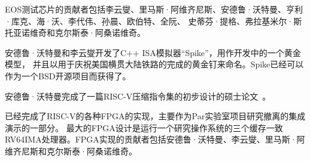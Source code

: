 EOS测试芯片的贡献者包括李云燮、里马斯·阿维齐尼斯、安德鲁·沃特曼、亨利·库克、海·沃、李代伟、孙晨、欧伯特、全阮、
史蒂芬·提格、弗拉基米尔·斯托亚诺维奇和克尔斯泰·阿桑诺维奇。

安德鲁·沃特曼和李云燮开发了C++ ISA模拟器“Spike”，用作开发中的一个黄金模型，
并且以用于庆祝美国横贯大陆铁路的完成的黄金钉来命名。Spike已经可以作为一个BSD开源项目而获得了。

安德鲁·沃特曼完成了一篇RISC-V压缩指令集的初步设计的硕士论文~\cite{waterman-ms}。

已经完成了RISC-V的各种FPGA的实现，主要作为Par实验室项目研究撤离的集成演示的一部分。
最大的FPGA设计是运行一个研究操作系统的三个缓存一致RV64IMA处理器。FPGA实现的贡献者包括安德鲁·沃特曼、李云燮、里马斯·阿维齐尼斯和克尔斯泰·阿桑诺维奇。

